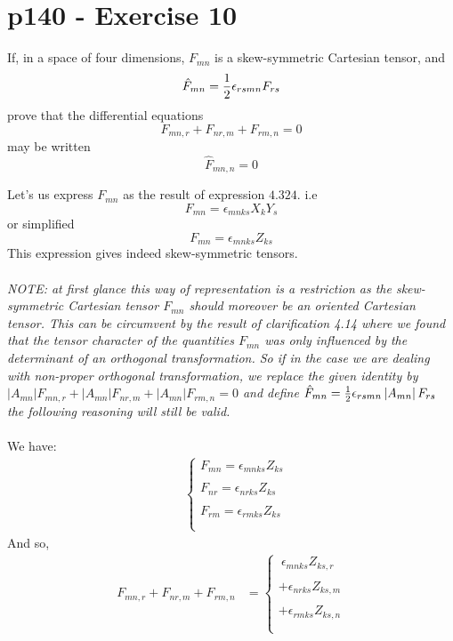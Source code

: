 \section{p140 - Exercise 10}
\begin{tcolorbox}
If, in a space of four dimensions, $F_{mn}$ is a skew-symmetric Cartesian tensor, and $$\hat{F}_{mn} = \frac{1}{2} \epsilon_{rsmn} F_{rs}$$
prove that the differential equations $$ F_{mn,r}+F_{nr,m}+F_{rm,n}=0$$ may be written $$\hat{F}_{mn,n} =0$$
\end{tcolorbox}
Let's us express $F_{mn}$ as the result of expression $\mathbf{4.324.} $ i.e $$F_{mn} = \epsilon_{mnks} X_kY_s$$ or simplified $$F_{mn} = \epsilon_{mnks} Z_{ks}$$
This expression gives indeed skew-symmetric tensors.\\\\
\textit{NOTE:  at first glance this way of representation is  a restriction as the  skew-symmetric Cartesian tensor $F_{mn}$ should moreover be an oriented Cartesian tensor. This can be circumvent by the result of clarification 4.14 where we found that the tensor character  of the quantities $F_{mn}$ was only influenced by the determinant of an orthogonal transformation. So if in the case we are dealing with non-proper orthogonal transformation,  we replace the given identity by   $ \left|A_{mn}\right|F_{mn,r}+\left|A_{mn}\right|F_{nr,m}+\left|A_{mn}\right|F_{rm,n}=0$ and define $\hat{F}_{mn} = \frac{1}{2} \epsilon_{rsmn}\left|A_{mn}\right| F_{rs}$ the following reasoning will still be valid.}\\\\
 We have:
\begin{align}
&\left\{\begin{array}{l}
F_{mn} = \epsilon_{mnks} Z_{ks}\\\\
F_{nr} = \epsilon_{nrks} Z_{ks}\\\\
F_{rm} = \epsilon_{rmks} Z_{ks}\\\\
\end{array}\right.
\end{align}
And so, 
\begin{align}
F_{mn,r}+F_{nr,m}+F_{rm,n}&=\left\{\begin{array}{l}
\ \epsilon_{mnks} Z_{ks,r}\\\\
+\epsilon_{nrks} Z_{ks,m}\\\\
+\epsilon_{rmks} Z_{ks,n}\\\\
\end{array}\right.
\end{align}

